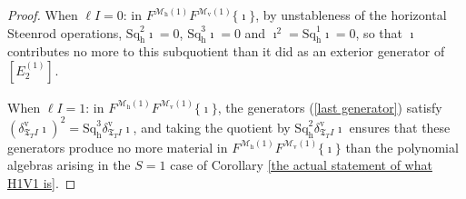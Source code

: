 \documentclass[11pt]{amsart} \renewcommand{\baselinestretch}{1.2}
\theoremstyle{plain}
\newtheorem{cor}[thm]{Corollary}
\numberwithin{equation}{section} %
\theoremstyle{plain}
\newtheorem{cor}[thm]{Corollary}
\numberwithin{equation}{chapter} %
\newcommand{\scrC}{\mathscr{C}}
\newcommand{\calV}{\mathcal{V}}
\newcommand{\calw}{\mathcal{W}}
\newcommand{\calx}{\mathcal{X}}
\newcommand{\calMv}{\mathcal{M}\dver}
\newcommand{\calMh}{\mathcal{M}\dhor}
\newcommand{\calMhv}{\mathcal{M}_\mathrm{hv}}
\newcommand{\CommOperad}{{\scrC}}
\newcommand{\vect}[2]{\calV^{#1}_{#2}}
\newcommand{\aDTirr}{\mathrm{adm}_+^\mathrm{irr}(\Delta,T)}
\newcommand{\algs}{{\scrC\!\textit{\normalfont\textit{om}}}}
\newcommand{\TOP}{\mathfrak{T}}
\newcommand{\E}[5]{[E^{#1}_{#2}#3]^{#4}_{#5}}
\newcommand{\uver}{^\mathrm{v}}
\newcommand{\dver}{_\mathrm{v}}
\newcommand{\dhor}{_\mathrm{h}}
\newcommand{\Sqh}{\mathrm{Sq}\dhor}
\newcommand{\deltav}{\delta\uver}
\begin{document}
\begin{Calculations of HWn}
\begin{proof}
When $\ell I=0$: in $F^{\calMh(1)}F^{\calMv(1)}\{\imath\}$, by unstableness of the horizontal Steenrod operations, $\Sqh^2\imath=0$, $\Sqh^3\imath=0$ and $\imath^2=\Sqh^1\imath=0$, so that $\imath$ contributes no more to this subquotient than it did as an exterior generator of $\E{(1)}{2}{}{}{}$.

When  $\ell I=1$: in $F^{\calMh(1)}F^{\calMv(1)}\{\imath\}$, the generators (\ref{last generator}) satisfy
$(\deltav_{\TOP_T I}\imath)^{2}=\Sqh^3\deltav_{\TOP_T I}\imath$, and taking the quotient by $\Sqh^2\deltav_{\TOP_T I}\imath$ ensures that these generators produce no more material in $F^{\calMh(1)}F^{\calMv(1)}\{\imath\}$ than the polynomial algebras arising in the $S=1$ case of Corollary \ref{the actual statement of what H1V1 is}.
\end{proof}

%



\end{Calculations of HWn}
\end{document}
